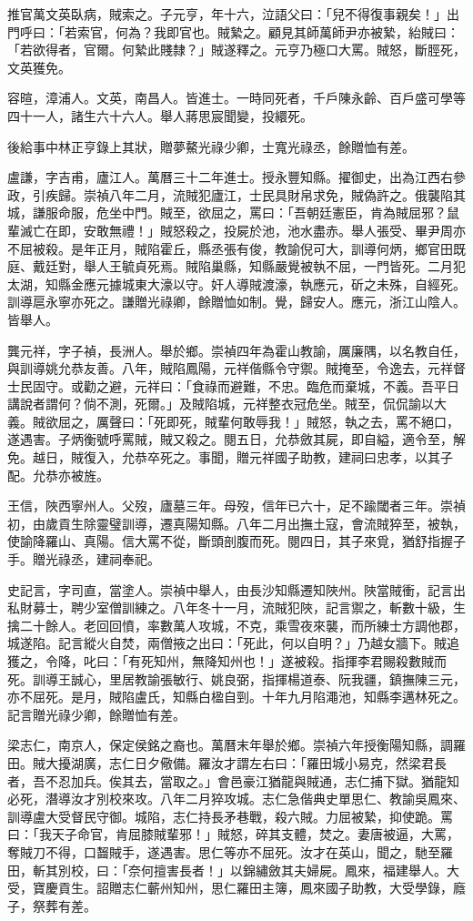 \begin{pinyinscope}
推官萬文英臥病，賊索之。子元亨，年十六，泣語父曰：「兒不得復事親矣！」出門呼曰：「若索官，何為？我即官也。賊縶之。顧見其師萬師尹亦被縶，紿賊曰：「若欲得者，官爾。何縶此賤隸？」賊遂釋之。元亨乃極口大罵。賊怒，斷脛死，文英獲免。

容暄，漳浦人。文英，南昌人。皆進士。一時同死者，千戶陳永齡、百戶盛可學等四十一人，諸生六十六人。舉人蔣思宸聞變，投繯死。

後給事中林正亨錄上其狀，贈夢鰲光祿少卿，士寬光祿丞，餘贈恤有差。

盧謙，字吉甫，廬江人。萬曆三十二年進士。授永豐知縣。擢御史，出為江西右參政，引疾歸。崇禎八年二月，流賊犯廬江，士民具財帛求免，賊偽許之。俄襲陷其城，謙服命服，危坐中門。賊至，欲屈之，罵曰：「吾朝廷憲臣，肯為賊屈邪？鼠輩滅亡在即，安敢無禮！」賊怒殺之，投屍於池，池水盡赤。舉人張受、畢尹周亦不屈被殺。是年正月，賊陷霍丘，縣丞張有俊，教諭倪可大，訓導何炳，鄉官田既庭、戴廷對，舉人王毓貞死焉。賊陷巢縣，知縣嚴覺被執不屈，一門皆死。二月犯太湖，知縣金應元據城東大濠以守。奸人導賊渡濠，執應元，斫之未殊，自經死。訓導扈永寧亦死之。謙贈光祿卿，餘贈恤如制。覺，歸安人。應元，浙江山陰人。皆舉人。

龔元祥，字子禎，長洲人。舉於鄉。崇禎四年為霍山教諭，厲廉隅，以名教自任，與訓導姚允恭友善。八年，賊陷鳳陽，元祥偕縣令守禦。賊掩至，令逸去，元祥督士民固守。或勸之避，元祥曰：「食祿而避難，不忠。臨危而棄城，不義。吾平日講說者謂何？倘不測，死爾。」及賊陷城，元祥整衣冠危坐。賊至，侃侃諭以大義。賊欲屈之，厲聲曰：「死即死，賊輩何敢辱我！」賊怒，執之去，罵不絕口，遂遇害。子炳衡號呼罵賊，賊又殺之。閱五日，允恭斂其屍，即自縊，適令至，解免。越日，賊復入，允恭卒死之。事聞，贈元祥國子助教，建祠曰忠孝，以其子配。允恭亦被旌。

王信，陜西寧州人。父歿，廬墓三年。母歿，信年已六十，足不踰閾者三年。崇禎初，由歲貢生除靈璧訓導，遷真陽知縣。八年二月出撫土寇，會流賊猝至，被執，使諭降羅山、真陽。信大罵不從，斷頭剖腹而死。閱四日，其子來覓，猶舒指握子手。贈光祿丞，建祠奉祀。

史記言，字司直，當塗人。崇禎中舉人，由長沙知縣遷知陜州。陜當賊衝，記言出私財募士，聘少室僧訓練之。八年冬十一月，流賊犯陜，記言禦之，斬數十級，生擒二十餘人。老回回憤，率數萬人攻城，不克，乘雪夜來襲，而所練士方調他郡，城遂陷。記言縱火自焚，兩僧掖之出曰：「死此，何以自明？」乃越女牆下。賊追獲之，令降，叱曰：「有死知州，無降知州也！」遂被殺。指揮李君賜殺數賊而死。訓導王誠心，里居教諭張敏行、姚良弼，指揮楊道泰、阮我疆，鎮撫陳三元，亦不屈死。是月，賊陷盧氏，知縣白楹自剄。十年九月陷澠池，知縣李邁林死之。記言贈光祿少卿，餘贈恤有差。

梁志仁，南京人，保定侯銘之裔也。萬曆末年舉於鄉。崇禎六年授衡陽知縣，調羅田。賊大擾湖廣，志仁日夕儆備。羅汝才謂左右曰：「羅田城小易克，然梁君長者，吾不忍加兵。俟其去，當取之。」會邑豪江猶龍與賊通，志仁捕下獄。猶龍知必死，潛導汝才別校來攻。八年二月猝攻城。志仁急偕典史單思仁、教諭吳鳳來、訓導盧大受督民守御。城陷，志仁持長矛巷戰，殺六賊。力屈被縶，抑使跪。罵曰：「我天子命官，肯屈膝賊輩邪！」賊怒，碎其支體，焚之。妻唐被逼，大罵，奪賊刀不得，口齧賊手，遂遇害。思仁等亦不屈死。汝才在英山，聞之，馳至羅田，斬其別校，曰：「奈何擅害長者！」以錦繡斂其夫婦屍。鳳來，福建舉人。大受，寶慶貢生。詔贈志仁蘄州知州，思仁羅田主簿，鳳來國子助教，大受學錄，廕子，祭葬有差。


\end{pinyinscope}
